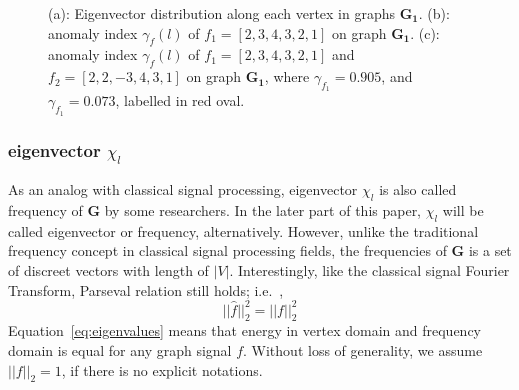 \begin{figure}[ht]
	\centering


	\caption{(a): Eigenvector distribution along each vertex in graphs $\mathbf{G_1}$.  (b): anomaly index $\gamma_f(l)$ of $f_1=[2,3,4,3,2,1]$ on graph $\mathbf{G_1}$. (c): anomaly index $\gamma_f(l)$ of $f_1=[2,3,4,3,2,1]$  and $f_2=[2,2,-3,4,3,1]$ on graph $\mathbf{G_1}$, where $\gamma_{f_1}=0.905$, and $\gamma_{f_1}=0.073$, labelled in red oval.}
	\label{fig:f_on_g2}
\end{figure}


\subsubsection{eigenvector $\chi_l$}
As an analog with classical signal processing, eigenvector $\chi_l$ is also called frequency of $\mathbf{G}$ by some researchers. In the later part of this paper, $\chi_l$ will be called eigenvector or frequency, alternatively. However, unlike the traditional frequency concept in classical signal processing fields, the frequencies of $\mathbf{G}$ is a set of discreet vectors with length of $|V|$. Interestingly, like the classical signal Fourier Transform, Parseval relation still holds; i.e.~\cite{shuman2015vertex},
\begin{equation}
\label{eq:Parseval}
||\hat{f}||_2^2=||f||_2^2
\end{equation}
Equation~\ref{eq:eigenvalues} means that energy in vertex domain and frequency domain is equal for any graph signal $f$. Without loss of generality, we assume $||f||_2 =1$, if there is no explicit notations.

